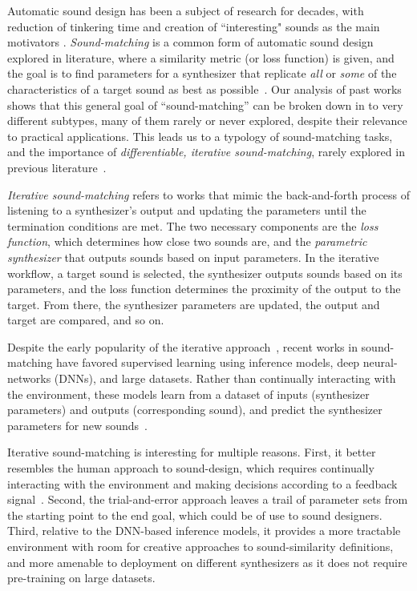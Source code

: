 \documentclass[lettersize,journal]{IEEEtran}
\providecommand{\gls}[1]{#1}
\begin{document}
Automatic sound design has been a subject of research for decades, with reduction of tinkering time and creation of ``interesting" sounds as the main motivators \cite{krekovic2019insights,turian2020sorry,horner1993machine,salimi2020make,esling2019flow,engel2020ddsp,mitchell2007evolutionary,shier2020spiegelib}. \textit{Sound-matching} is a common form of automatic sound design explored in literature, where a similarity metric (or loss function) is given, and the goal is to find parameters for a synthesizer that replicate \textit{all} or \textit{some} of the characteristics of a target sound as best as possible~\cite{horner1993machine,mitchell2007evolutionary}. Our analysis of past works shows that this general goal of ``sound-matching'' can be broken down in to very different subtypes, many of them rarely or never explored, despite their relevance to practical applications. This leads us to a typology of sound-matching tasks, and the importance of \textit{differentiable, iterative sound-matching}, rarely explored in previous literature~\cite{vahidi2023mesostructures}.

\textit{Iterative sound-matching} refers to works that mimic the back-and-forth process of listening to a synthesizer's output and updating the parameters until the termination conditions are met. The two necessary components are the \textit{loss function}, which determines how close two sounds are, and the \textit{parametric synthesizer} that outputs sounds based on input parameters. In the iterative workflow, a target sound is selected, the synthesizer outputs sounds based on its parameters, and the loss function determines the proximity of the output to the target. From there, the synthesizer parameters are updated, the output and target are compared, and so on. 

Despite the early popularity of the iterative approach~\cite{justice1979analytic,horner1993machine,mitchell2007evolutionary}, recent works in sound-matching have favored supervised learning using inference models, deep neural-networks (\gls{DNNs}), and large datasets. Rather than continually interacting with the environment, these models learn from a dataset of inputs (synthesizer parameters) and outputs (corresponding sound), and predict the synthesizer parameters for new sounds~\cite{yee2018automatic,han2023perceptual,han2024learning}. 

Iterative sound-matching is interesting for multiple reasons. First, it better resembles the human approach to sound-design, which requires continually interacting with the environment and making decisions according to a feedback signal~\cite{sutton2018reinforcement}. Second, the trial-and-error approach leaves a trail of parameter sets from the starting point to the end goal, which could be of use to sound designers. Third, relative to the DNN-based inference models, it provides a more tractable environment with room for creative approaches to sound-similarity definitions, and more amenable to deployment on different synthesizers as it does not require pre-training on large datasets. 
\end{document}
